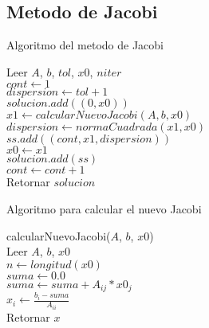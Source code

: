 \documentclass[12pt]{article}
\begin{document}
        \subsection{Metodo de Jacobi}

        \begin{algorithm}[H]
            \caption{Algoritmo del metodo de Jacobi}
            Leer $A$, $b$, $tol$, $x0$, $niter$\\
            $cont \leftarrow 1$\\
            $dispersion \leftarrow tol + 1$\\
            $solucion.add((0, x0))$\\
            {
                $x1 \leftarrow calcularNuevoJacobi(A, b, x0)$\\
                $dispersion \leftarrow normaCuadrada(x1, x0)$\\
                $ss.add((cont, x1, dispersion))$\\
                $x0 \leftarrow x1$\\
                $solucion.add(ss)$\\
                $cont \leftarrow cont + 1$\\
            }
            Retornar $solucion$\\
        \end{algorithm}
        
        
        \begin{algorithm}[H]
            \caption{Algoritmo para calcular el nuevo Jacobi}
            calcularNuevoJacobi($A$, $b$, $x0$)\\
            Leer $A$, $b$, $x0$\\
            $n \leftarrow longitud(x0)$\\
            {
                $suma \leftarrow 0.0$\\
                {
                    {
                        $suma \leftarrow suma + A_{ij} * x0_j$\\
                    }
                }
                $x_i \leftarrow \frac{b_i - suma}{A_{ii}}$\\
            }
            Retornar $x$\\
        \end{algorithm}
\end{document}
